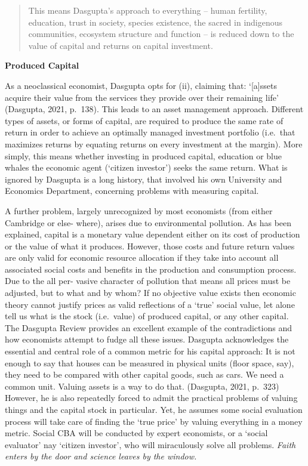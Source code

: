 \documentclass[
]{book}
\begin{document}
\begin{quote}
This means Dasgupta's approach to everything -- human fertility, education, trust in
society, species existence, the sacred in indigenous communities, ecosystem structure and function
-- is reduced down to the value of capital and returns on capital investment.
\end{quote}

\textbf{Produced Capital}

As a neoclassical economist, Dasgupta opts for (ii), claiming that: `{[}a{]}ssets acquire their value from
the services they provide over their remaining life' (Dasgupta, 2021, p.~138). This leads to an asset management approach.
Different types of assets, or forms of capital, are required to produce the
same rate of return in order to achieve an optimally managed investment portfolio (i.e.~that maximizes
returns by equating returns on every investment at the margin). More simply, this means whether
investing in produced capital, education or blue whales the economic agent (`citizen investor')
seeks the same return. What is ignored by Dasgupta is a long history, that involved his own University
and Economics Department, concerning problems with measuring capital.

A further problem, largely unrecognized by most economists (from either Cambridge or else-
where), arises due to environmental pollution. As has been explained, capital is a monetary value
dependent either on its cost of production or the value of what it produces. However, those costs
and future return values are only valid for economic resource allocation if they take into account
all associated social costs and benefits in the production and consumption process. Due to the all per-
vasive character of pollution that means all prices must be adjusted, but to what and by whom? If no
objective value exists then economic theory cannot justify prices as valid reflections of a `true' social
value, let alone tell us what is the stock (i.e.~value) of produced capital, or any other capital.
The Dasgupta Review provides an excellent example of the contradictions and how economists
attempt to fudge all these issues. Dasgupta acknowledges the essential and central role of a common
metric for his capital approach:
It is not enough to say that houses can be measured in physical units (floor space, say), they need to be
compared with other capital goods, such as cars. We need a common unit. Valuing assets is a way to do
that. (Dasgupta, 2021, p.~323)
However, he is also repeatedly forced to admit the practical problems of valuing things and the
capital stock in particular. Yet, he assumes some social evaluation process will take care of
finding the `true price' by valuing everything in a money metric. Social CBA will be conducted
by expert economists, or a `social evaluator' nay `citizen investor', who will miraculously solve
all problems. \emph{Faith enters by the door and science leaves by the window.}
\end{document}

